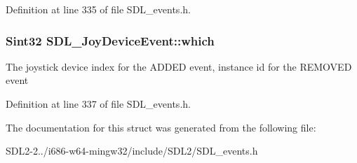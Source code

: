 Definition at line 335 of file S\+D\+L\+\_\+events.\+h.

\hypertarget{structSDL__JoyDeviceEvent_af9b295798f033b799ebbda7de6cb5a7e}{
\subsubsection[{which}]{\setlength{\rightskip}{0pt plus 5cm}Sint32 S\+D\+L\+\_\+\+Joy\+Device\+Event\+::which}}\label{structSDL__JoyDeviceEvent_af9b295798f033b799ebbda7de6cb5a7e}
The joystick device index for the A\+D\+D\+E\+D event, instance id for the R\+E\+M\+O\+V\+E\+D event 

Definition at line 337 of file S\+D\+L\+\_\+events.\+h.



The documentation for this struct was generated from the following file\+:\begin{DoxyCompactItemize}
\item 
S\+D\+L2-\/2../i686-\/w64-\/mingw32/include/\+S\+D\+L2/S\+D\+L\+\_\+events.\+h\end{DoxyCompactItemize}
